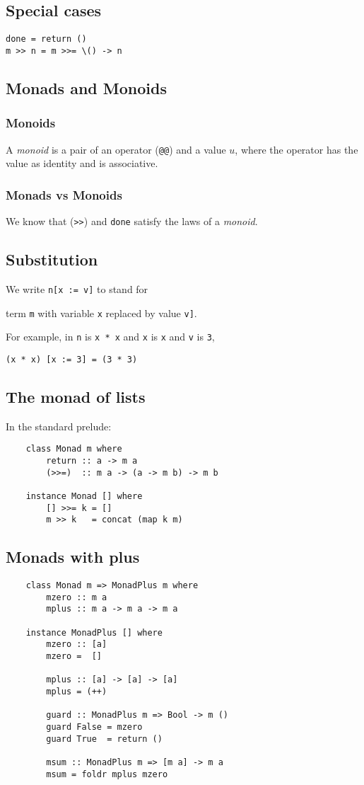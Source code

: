 \documentclass{article}
\begin{document}
\subsection{Special cases}
\begin{verbatim}
done = return ()
m >> n = m >>= \() -> n
\end{verbatim}
\subsection{Monads and Monoids}
\subsubsection{Monoids}
A \emph{monoid} is a pair of an operator (\texttt{@@}) and a value $u$, where the operator has the value as identity and is associative.
\subsubsection{Monads vs Monoids}
We know that (\texttt{>>}) and \texttt{done} satisfy the laws of a \emph{monoid}.
\subsection{Substitution}
We write \texttt{n[x := v]} to stand for
\begin{center}
    term \texttt{m} with variable \texttt{x} replaced by value \texttt{v]}.
\end{center}
For example, in \texttt{n} is \texttt{x * x} and \texttt{x} is \texttt{x} and \texttt{v} is \texttt{3},
\begin{center}
    \texttt{(x * x) [x := 3] = (3 * 3)}
\end{center}
\subsection{The monad of lists}
In the standard prelude:
\begin{verbatim}
    class Monad m where
        return :: a -> m a
        (>>=)  :: m a -> (a -> m b) -> m b
    
    instance Monad [] where
        [] >>= k = []
        m >> k   = concat (map k m)
\end{verbatim}
\subsection{Monads with plus}
\begin{verbatim}
    class Monad m => MonadPlus m where
        mzero :: m a
        mplus :: m a -> m a -> m a
    
    instance MonadPlus [] where
        mzero :: [a]
        mzero =  []

        mplus :: [a] -> [a] -> [a]
        mplus = (++)

        guard :: MonadPlus m => Bool -> m ()
        guard False = mzero
        guard True  = return ()

        msum :: MonadPlus m => [m a] -> m a
        msum = foldr mplus mzero
\end{verbatim}
\end{document}
